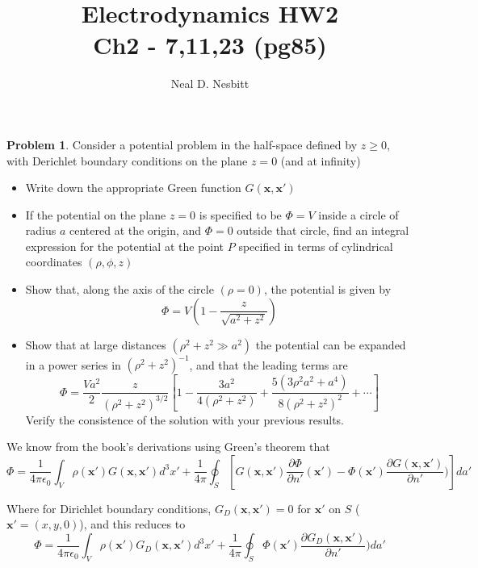 \documentclass{article}
\title{Electrodynamics HW2\\
Ch2 - 7,11,23 (pg85)}
\author{Neal D. Nesbitt}
\begin{document}
\maketitle

\theoremstyle{definition}
\newtheorem{problem}{Problem}

\setcounter{problem}{6}
\begin{problem}
Consider a potential problem in the half-space defined by $z\ge 0$, with Derichlet boundary conditions on the plane $z=0$ (and at infinity)
\begin{itemize}
\item Write down the appropriate Green function $G(\mathbf{x},\mathbf{x}')$
\item If the potential on the plane $z=0$ is specified to be $\Phi=V$ inside a circle of radius $a$ centered at the origin, and $\Phi = 0$ outside that circle, find an integral expression for the potential at the point $P$ specified in terms of cylindrical coordinates $(\rho,\phi,z)$
\item Show that, along the axis of the circle $(\rho = 0)$, the potential is given by
\[ \Phi = V \left( 1 - \frac{z}{\sqrt{a^{2}+z^{2}}} \right) \]
\item Show that at large distances $(\rho^{2}+z^{2} \gg a^{2} )$ the potential can be expanded in a power series in $(\rho^{2}+z^{2})^{-1}$, and that the leading terms are
\[ \Phi = \frac{Va^{2}}{2} \frac{z}{(\rho^{2}+z^{2})^{3/2}} \left[ 1 - \frac{3a^{2}}{4(\rho^{2}+z^{2})} + \frac{5(3\rho^{2}a^{2}+a^{4})}{8(\rho^{2}+z^{2})^{2}} + \cdots \right] \]
Verify the consistence of the solution with your previous results.
\end{itemize}
\end{problem}

We know from the book's derivations using Green's theorem that
\[ \Phi = \frac{1}{4\pi\epsilon_{0}} \int_{V} \rho(\mathbf{x'}) G(\mathbf{x},\mathbf{x'}) d^{3}x' + \frac{1}{4\pi} \oint_{S} \left[ G(\mathbf{x},\mathbf{x'}) \frac{\partial\Phi}{\partial n'}(\mathbf{x'}) -\Phi(\mathbf{x'}) \frac{\partial G(\mathbf{x},\mathbf{x'})}{\partial n'}) \right] da' \]


Where for Dirichlet boundary conditions, $G_{D}(\mathbf{x},\mathbf{x'})=0$ for $\mathbf{x'}$ on $S$ ( $\mathbf{x'}=(x,y,0)$), and this reduces to
\[ \Phi = \frac{1}{4\pi\epsilon_{0}} \int_{V} \rho(\mathbf{x'}) G_{D}(\mathbf{x},\mathbf{x'}) d^{3}x' + \frac{1}{4\pi} \oint_{S} \Phi(\mathbf{x'}) \frac{\partial G_{D}(\mathbf{x},\mathbf{x'})}{\partial n'}) da' \]
\end{document}
